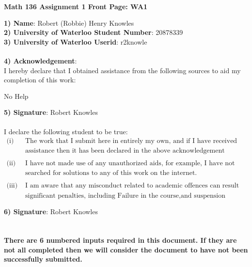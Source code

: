 \documentclass[11pt]{article}
\begin{document}
\begin{center}
\textbf{Math 136 Assignment 1 Front Page: WA1}
\end{center}
\textbf{1) Name}: Robert (Robbie) Henry Knowles \\
\textbf{2) University of Waterloo Student Number}: 20878339 \\
\textbf{3) University of Waterloo Userid}: r2knowle \\\\
\textbf{4) Acknowledgement}: \\
I hereby declare that I obtained assistance from the following sources to aid my completion of this work: 
\begin{center}
No Help
\end{center} 
\textbf{5) Signature}: Robert Knowles \\\\
I declare the following student to be true:
\begin{align*}
 \text{(i)     }  & \text{The work that I submit here in entirely my own, and if I have received any}\\
                     &  \text{assistance then it has been declared in the above acknowledgement}\\\\
 \text{(ii)    }  & \text{I have not made use of any unauthorized aids, for example, I have not}\\
                     &  \text{searched for solutions to any of this work on the internet.}\\\\
 \text{(iii)   } & \text{I am aware that any misconduct related to academic offences can result in}\\
                     &  \text{significant penalties, including Failure in the course,and suspension (covered in Policy 71)}\\\\
\end{align*} 
\textbf{6) Signature}: Robert Knowles \\\\\\

\textbf{There are 6 numbered inputs required in this document. If they are not all completed then we will consider the document to have not been successfully submitted.}\\\
\end{document}
